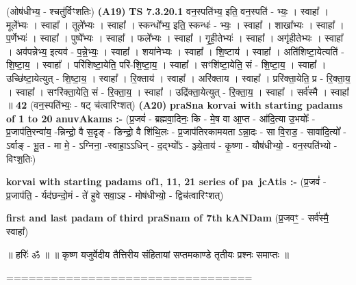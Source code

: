 \documentclass[17pt]{extarticle}
\begin{document}
                  \newline
                      (ओष॑धीभ्य॒ - श्चतु॑र्विꣳशतिः)  \textbf{(A19)} \newline \newline
                                \textbf{ TS 7.3.20.1} \newline
                  वन॒स्पति॑भ्य॒ इति॒ वन॒स्पति॑ - भ्यः॒ । स्वाहा᳚ । मूले᳚भ्यः । स्वाहा᳚ । तूले᳚भ्यः । स्वाहा᳚ । स्कन्धो᳚भ्य॒ इति॒ स्कन्धः॑ - भ्यः॒ । स्वाहा᳚ । शाखा᳚भ्यः । स्वाहा᳚ । प॒र्णेभ्यः॑ । स्वाहा᳚ । पुष्पे᳚भ्यः । स्वाहा᳚ । फले᳚भ्यः । स्वाहा᳚ । गृ॒ही॒तेभ्यः॑ । स्वाहा᳚ । अगृ॑हीतेभ्यः । स्वाहा᳚ । अव॑पन्नेभ्य॒ इत्यव॑ - प॒न्ने॒भ्यः॒ । स्वाहा᳚ । शया॑नेभ्यः । स्वाहा᳚ । शि॒ष्टाय॑ । स्वाहा᳚ । अति॑शिष्टा॒येत्यति॑ - शि॒ष्टा॒य॒ । स्वाहा᳚ । परि॑शिष्टा॒येति॒ परि॑-शि॒ष्टा॒य॒ । स्वाहा᳚ । सꣳशि॑ष्टा॒येति॒ सं - शि॒ष्टा॒य॒ । स्वाहा᳚ । उच्छि॑ष्टा॒येत्युत् - शि॒ष्टा॒य॒ । स्वाहा᳚ । रि॒क्ताय॑ । स्वाहा᳚ । अरि॑क्ताय । स्वाहा᳚ । प्ररि॑क्ता॒येति॒ प्र - रि॒क्ता॒य॒ । स्वाहा᳚ । सꣳरि॑क्ता॒येति॒ सं - रि॒क्ता॒य॒ । स्वाहा᳚ । उद्रि॑क्ता॒येत्युत् - रि॒क्ता॒य॒ । स्वाहा᳚ । सर्व॑स्मै । स्वाहा᳚ ॥ \textbf{  42 } \newline
                  \newline
                      (वन॒स्पति॑भ्यः॒ - षट् च॑त्वारिꣳशत्)  \textbf{(A20)} \newline \newline
\textbf{praSna korvai with starting padams of 1 to 20 anuvAkams :-} \newline
(प्र॒जवं॑ - ब्रह्मवा॒दिनः॒ कि - मे॒ष वा आ॒प्त - आ॑दि॒त्या उ॒भयोः᳚ - प्र॒जाप॑ति॒रन्वा॑य॒ -न्निन्द्रो॒ वै स॒दृङ् - ङिन्द्रो॒ वै शि॑थि॒लः - प्र॒जाप॑तिरकामयता ऽन्ना॒दः - सा वि॒राड॒ - सावा॑दि॒त्यो᳚ - ऽर्वाङ् - भू॒त - मा मे॒ - ऽग्निना॒ -स्वाहा॒ऽऽधिन् - द॒द्भ्यो᳚ऽ - ञ्ज्ये॒ताय॑ - कृ॒ष्णा - यौष॑धीभ्यो॒ - वन॒स्पति॑भ्यो - विꣳश॒तिः) \newline

\textbf{korvai with starting padams of1, 11, 21 series of pa~jcAtis :-} \newline
(प्र॒जवं॑ - प्र॒जाप॑ति॒ - र्यद॑छन्दो॒मं - ते॑ हुवे सवा॒ऽह - मोष॑धीभ्यो॒ - द्विच॑त्वारिꣳशत्) \newline

\textbf{first and last padam of third praSnam of 7th kANDam} \newline
(प्र॒जवꣳ॒॒ - सर्व॑स्मै॒ स्वाहा᳚) \newline 


॥ हरिः॑ ॐ ॥
॥ कृष्ण यजुर्वेदीय तैत्तिरीय संहितायां सप्तमकाण्डे तृतीयः प्रश्नः समाप्तः ॥

================================= \newline
\pagebreak
\pagebreak
        
\end{document}
